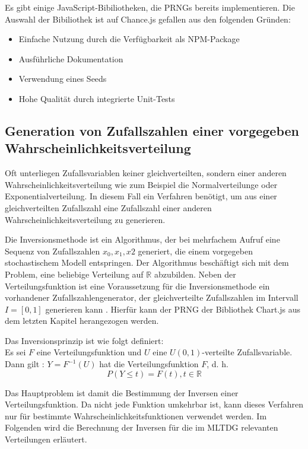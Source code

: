 Es gibt einige JavaScript-Bibiliotheken, die \ac{PRNG}s bereits implementieren. Die Auswahl der Bibiliothek ist auf Chance.js gefallen aus den folgenden Gründen:
\begin{itemize}
    \item Einfache Nutzung durch die Verfügbarkeit als NPM-Package
    \item Ausführliche Dokumentation
    \item Verwendung eines Seeds
    \item Hohe Qualität durch integrierte Unit-Tests
\end{itemize}

\subsection{Generation von Zufallszahlen einer vorgegeben Wahrscheinlichkeitsverteilung}

Oft unterliegen Zufallsvariablen keiner gleichverteilten, sondern einer anderen Wahrscheinlichkeitsverteilung wie zum Beispiel die Normalverteilunge oder Exponentialverteilung. In diesem Fall ein Verfahren benötigt, um aus einer gleichverteilten Zufallszahl eine Zufallszahl einer anderen Wahrscheinlichkeitsverteilung zu generieren.

Die Inversionsmethode ist ein Algorithmus, der bei mehrfachem Aufruf eine Sequenz von Zufallszahlen $x_0, x_1, x2$ generiert, die einem vorgegeben stochastischem Modell entspringen. Der Algorithmus beschäftigt sich mit dem Problem, eine beliebige Verteilung auf $\mathbb{R}$ abzubilden. Neben der Verteilungsfunktion ist eine Voraussetzung für die Inversionsmethode ein vorhandener Zufallszahlengenerator, der gleichverteilte Zufallszahlen im Intervall $I=[0,1]$ generieren kann \cite{Inversionsmethode}. Hierfür kann der \ac{PRNG} der Bibliothek Chart.js aus dem letzten Kapitel herangezogen werden.

Das Inversionsprinzip ist wie folgt definiert:\\
Es sei $F$ eine Verteilungsfunktion und $U$ eine $U(0,1)$-verteilte Zufallsvariable.\\
Dann gilt \cite{Inversionsmethode}: $Y = F^{-1}(U)$ hat die Verteilungsfunktion $F$, d. h.
$$P(Y \le t)=F(t),t \in \mathbb{R}$$

Das Hauptproblem ist damit die Bestimmung der Inversen einer Verteilungsfunktion. Da nicht jede Funktion umkehrbar ist, kann dieses Verfahren nur für bestimmte Wahrscheinlichkeitsfunktionen verwendet werden. Im Folgenden wird die Berechnung der Inversen für die im \ac{MLTDG} relevanten Verteilungen erläutert.

